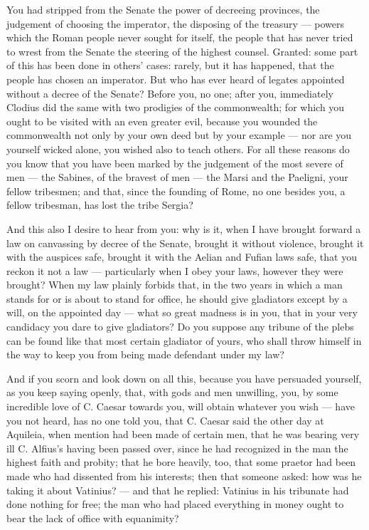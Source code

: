  You had stripped from the Senate the power of decreeing provinces, the judgement of choosing the imperator, the disposing of the treasury --- powers which the Roman people never sought for itself, the people that has never tried to wrest from the Senate the steering of the highest counsel. Granted: some part of this has been done in others' cases: rarely, but it has happened, that the people has chosen an imperator. But who has ever heard of legates appointed without a decree of the Senate? Before you, no one; after you, immediately Clodius did the same with two prodigies of the commonwealth; for which you ought to be visited with an even greater evil, because you wounded the commonwealth not only by your own deed but by your example --- nor are you yourself wicked alone, you wished also to teach others. For all these reasons do you know that you have been marked by the judgement of the most severe of men --- the Sabines, of the bravest of men --- the Marsi and the Paeligni, your fellow tribesmen; and that, since the founding of Rome, no one besides you, a fellow tribesman, has lost the tribe Sergia?

 And this also I desire to hear from you: why is it, when I have brought forward a law on canvassing by decree of the Senate, brought it without violence, brought it with the auspices safe, brought it with the Aelian and Fufian laws safe, that you reckon it not a law --- particularly when I obey your laws, however they were brought? When my law plainly forbids that, in the two years in which a man stands for or is about to stand for office, he should give gladiators except by a will, on the appointed day --- what so great madness is in you, that in your very candidacy you dare to give gladiators? Do you suppose any tribune of the plebs can be found like that most certain gladiator of yours, who shall throw himself in the way to keep you from being made defendant under my law?

 And if you scorn and look down on all this, because you have persuaded yourself, as you keep saying openly, that, with gods and men unwilling, you, by some incredible love of C. Caesar towards you, will obtain whatever you wish --- have you not heard, has no one told you, that C. Caesar said the other day at Aquileia, when mention had been made of certain men, that he was bearing very ill C. Alfius's having been passed over, since he had recognized in the man the highest faith and probity; that he bore heavily, too, that some praetor had been made who had dissented from his interests; then that someone asked: how was he taking it about Vatinius? --- and that he replied: Vatinius in his tribunate had done nothing for free; the man who had placed everything in money ought to bear the lack of office with equanimity?

